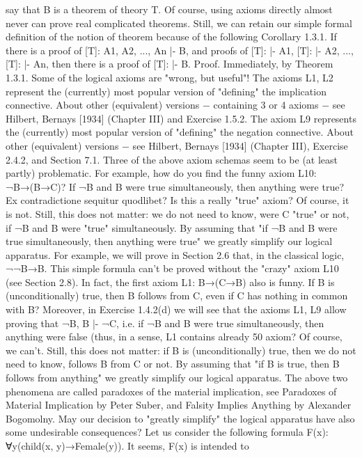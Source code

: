 say that B is a theorem of theory T. Of course, using axioms directly almost never can prove real
complicated theorems. Still, we can retain our simple formal definition of the notion of theorem because
of the following
Corollary 1.3.1. If there is a proof of [T]: A1, A2, ..., An |- B, and proofs of [T]: |- A1, [T]: |- A2, ..., [T]: |-
An, then there is a proof of [T]: |- B.
Proof. Immediately, by Theorem 1.3.1.
Some of the logical axioms are "wrong, but useful"!
The axioms L1, L2 represent the (currently) most popular version of "defining" the implication
connective. About other (equivalent) versions − containing 3 or 4 axioms − see Hilbert, Bernays [1934]
(Chapter III) and Exercise 1.5.2.
The axiom L9 represents the (currently) most popular version of "defining" the negation connective.
About other (equivalent) versions − see Hilbert, Bernays [1934] (Chapter III), Exercise 2.4.2, and Section
7.1.
Three of the above axiom schemas seem to be (at least partly) problematic.
For example, how do you find the funny axiom L10: ¬B→(B→C)? If ¬B and B were true simultaneously,
then anything were true? Ex contradictione sequitur quodlibet? Is this a really "true" axiom? Of course, it
is not. Still, this does not matter: we do not need to know, were C "true" or not, if ¬B and B were "true"
simultaneously. By assuming that "if ¬B and B were true simultaneously, then anything were true" we
greatly simplify our logical apparatus. For example, we will prove in Section 2.6 that, in the classical
logic, ¬¬B→B. This simple formula can't be proved without the "crazy" axiom L10 (see Section 2.8).
In fact, the first axiom L1: B→(C→B) also is funny. If B is (unconditionally) true, then B follows from C,
even if C has nothing in common with B? Moreover, in Exercise 1.4.2(d) we will see that the axioms L1,
L9 allow proving that ¬B, B |- ¬C, i.e. if ¬B and B were true simultaneously, then anything were false
(thus, in a sense, L1 contains already 50%
axiom? Of course, we can't. Still, this does not matter: if B is (unconditionally) true, then we do not need
to know, follows B from C or not. By assuming that "if B is true, then B follows from anything" we
greatly simplify our logical apparatus.
The above two phenomena are called paradoxes of the material implication, see Paradoxes of Material
Implication by Peter Suber, and Falsity Implies Anything by Alexander Bogomolny.
May our decision to "greatly simplify" the logical apparatus have also some undesirable consequences?
Let us consider the following formula F(x): ∀y(child(x, y)→Female(y)). It seems, F(x) is intended to
